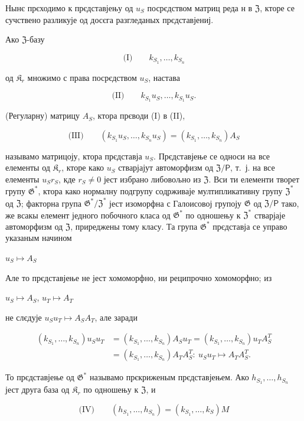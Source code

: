 \documentclass[11pt]{article}
\begin{document}
Нынє прєходимо к прєдставјењу од \(u_S\) посрєдством матриц реда н в \(\mathfrak{Z}\), кторе се сучствено разликује од досєга разгледаных прєдставјениј.

Ако \(\mathfrak Z\)-базу

\[
\text{(I)}\qquad k_{S_1}, \ldots, k_{S_n}
\]

од \(\mathfrak K_r\) множимо с права посрєдством \(u_S\), настава

\[
\text{(II)}\qquad k_{S_1}u_S, \ldots, k_{S_1}u_S.
\]

(Регуларну) матрицу \(A_S\), ктора прєводи (I) в (II),

\[
\text{(III)}\qquad (k_{S_1}u_S, \ldots, k_{S_n}u_S) = (k_{S_1}, \ldots, k_{S_n})A_S
\]

называмо матрицоју, ктора прєдставја \(u_S\). Прєдставјење се односи на все елементы од \(\mathfrak K_{r}\), кторе како \(u_S\) стварјајут автоморфизм од \(\mathfrak Z/\mathsf{P}\), т.~ј. на все елементы \(u_Sr_S\), кде \(r_S \neq 0\) јест избрано либовољно из \(\mathfrak Z\). Вси ти елементи творет групу \(\mathfrak G^*\), ктора како нормалну подгрупу содрживаје мултипликативну групу \(\mathfrak Z^*\) од \(\mathfrak Z\); факторна група \(\mathfrak G^*/\mathfrak Z^*\) јест изоморфна с Галоисовој групоју \(\mathfrak G\) од \(\mathfrak Z/\mathsf{P}\) тако, же всакы елемент једного побочного класа од \(\mathfrak G^*\) по одношењу к \(\mathfrak Z^*\) стварјаје автоморфизм од \(\mathfrak Z\), приреджены тому класу. Та група \(\mathfrak G^*\) прєдставја се управо указаным начином

\(u_S \mapsto A_S\)

Але то прєдставјење не јест хомоморфно, ни реципрочно хомоморфно; из

\(u_S \mapsto A_S\), \(u_T \mapsto A_T\)

не слєдује \(u_Su_T \mapsto A_SA_T\), але заради

\[
\begin{aligned}
(k_{S_1}, \ldots, k_{S_n})u_Su_T
&=(k_{S_1}, \ldots, k_{S_n})A_Su_T
=(k_{S_1}, \ldots, k_{S_n})u_TA_S^T\\
&=(k_{S_1}, \ldots, k_{S_n})A_TA_S^T:\ u_Su_T\mapsto A_TA_S^T.
\end{aligned}
\]

То прєдставјење од \(\mathfrak{G}^*\) называмо прєкриженым прєдставјењем. Ако \(h_{S_1}, \ldots, h_{S_n}\) јест друга база од \(\mathfrak{K}_r\) по одношењу к \(\mathfrak{Z}\), и

\[
\text{(IV)}\qquad (h_{S_1}, \ldots, h_{S_n}) = (k_{S_1}, \ldots, k_S)M
\]
\end{document}

